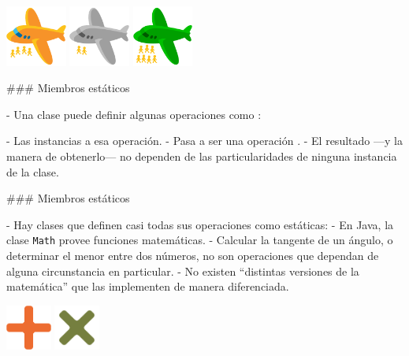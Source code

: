\columnsbegin
{}
\centering\includegraphics[width=20mm]{icons/92-emoji_android_airplane_withpeople.png}
\centering\includegraphics[width=20mm]{icons/92-emoji_android_airplane_gray_withpeople.png}
\centering\includegraphics[width=20mm]{icons/92-emoji_android_airplane_green_withpeople.png}
\columnsend

### Miembros estáticos


- Una clase puede definir algunas operaciones como :

\buildrboxx[0.9\textwidth]{}

- Las instancias  a esa operación.
- Pasa a ser una operación .
- El resultado ---y la manera de obtenerlo--- no dependen de las particularidades de ninguna instancia de la clase.

\finishrboxx

### Miembros estáticos


- Hay clases que definen casi todas sus operaciones como estáticas:
    - En Java, la clase \texttt{Math} provee funciones matemáticas.
    - Calcular la tangente de un ángulo, o determinar el menor entre dos números, no son
    operaciones que dependan de alguna circunstancia en particular.
        - No existen ``distintas versiones de la matemática'' que las implementen de manera
        diferenciada.

\columnsbegin
{}
\centering\includegraphics[width=15mm]{icons/113-emoji_android_heavy_plus_sign.png}
\centering\includegraphics[width=15mm]{icons/100-emoji_android_heavy_multiplication_x.png}
\columnsend

